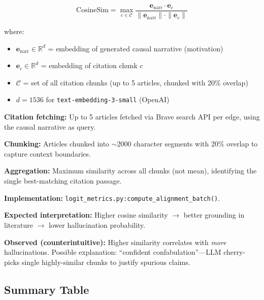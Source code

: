 \begin{equation}
\text{CosineSim} = \max_{c \in \mathcal{C}} \frac{\mathbf{e}_{\text{narr}} \cdot \mathbf{e}_c}{\|\mathbf{e}_{\text{narr}}\| \cdot \|\mathbf{e}_c\|}
\label{eq:cosine_def}
\end{equation}

where:
\begin{itemize}
    \item $\mathbf{e}_{\text{narr}} \in \mathbb{R}^{d}$ = embedding of generated causal narrative (motivation)
    \item $\mathbf{e}_c \in \mathbb{R}^{d}$ = embedding of citation chunk $c$
    \item $\mathcal{C}$ = set of all citation chunks (up to 5 articles, chunked with 20\% overlap)
    \item $d = 1536$ for \texttt{text-embedding-3-small} (OpenAI)
\end{itemize}

\textbf{Citation fetching:} Up to 5 articles fetched via Brave search API per edge, using the causal narrative as query.

\textbf{Chunking:} Articles chunked into $\sim$2000 character segments with 20\% overlap to capture context boundaries.

\textbf{Aggregation:} Maximum similarity across all chunks (not mean), identifying the single best-matching citation passage.

\textbf{Implementation:} \texttt{logit\_metrics.py:compute\_alignment\_batch()}.

\textbf{Expected interpretation:} Higher cosine similarity $\rightarrow$ better grounding in literature $\rightarrow$ lower hallucination probability.

\textbf{Observed (counterintuitive):} Higher similarity correlates with \textit{more} hallucinations. Possible explanation: ``confident confabulation''---LLM cherry-picks single highly-similar chunks to justify spurious claims.

\subsection{Summary Table}

